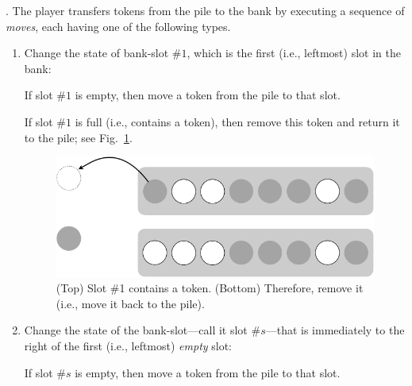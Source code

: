.
The player transfers tokens from the pile to the bank by executing a sequence of {\it moves}, each having one of the following types.
\begin{enumerate}
\item
Change the state of bank-slot \#$1$, which is the first (i.e., leftmost) slot in the bank:

\smallskip

If slot \#$1$ is empty, then move a token from the pile to that slot.

\smallskip

If slot \#$1$ is full (i.e., contains a token), then remove this token and return it to the pile; see Fig.~\ref{fig:rule1}.
\begin{figure}[h]
\begin{center}
        \includegraphics[scale=0.3]{FiguresMaths/GameTokenRule1.png}
\caption{(Top) Slot \#1 contains a token.  (Bottom) Therefore, remove it (i.e., move it back to the pile).}
        \label{fig:rule1}
\end{center}
\end{figure}

\item
Change the state of the bank-slot---call it slot \#$s$---that is immediately to the right of the first (i.e., leftmost) {\em empty} slot:

\smallskip

If slot \#$s$ is empty, then move a token from the pile to that slot.

\smallskip


\end{enumerate}
